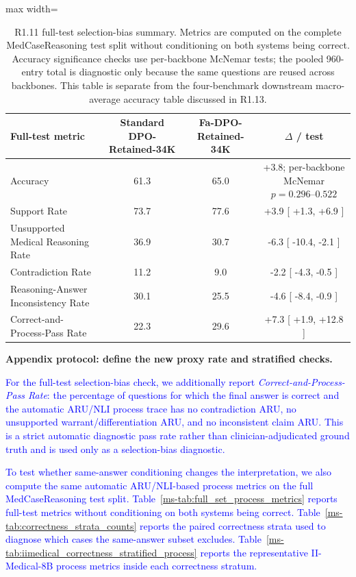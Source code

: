 \documentclass[12pt]{article}
\newcommand{\added}[1]{\textcolor{blue}{#1}}
\begin{document}
\begin{table}[htbp]
\centering
\small
\caption{R1.11 full-test selection-bias summary. Metrics are computed on the complete MedCaseReasoning test split without conditioning on both systems being correct. Accuracy significance checks use per-backbone McNemar tests; the pooled 960-entry total is diagnostic only because the same questions are reused across backbones. This table is separate from the four-benchmark downstream macro-average accuracy table discussed in R1.13.}
\label{tab:response_r111_full_test_summary}
\begin{adjustbox}{max width=\textwidth}
\begingroup\color{blue}
\begin{tabular}{@{}lccc@{}}
\toprule
\textbf{Full-test metric} & \textbf{Standard DPO-Retained-34K} & \textbf{Fa-DPO-Retained-34K} & \textbf{$\Delta$ / test} \\
\midrule
Accuracy & 61.3 & 65.0 & +3.8; per-backbone McNemar $p=0.296$--$0.522$ \\
Support Rate & 73.7 & 77.6 & +3.9 [ +1.3, +6.9 ] \\
Unsupported Medical Reasoning Rate & 36.9 & 30.7 & -6.3 [ -10.4, -2.1 ] \\
Contradiction Rate & 11.2 & 9.0 & -2.2 [ -4.3, -0.5 ] \\
Reasoning-Answer Inconsistency Rate & 30.1 & 25.5 & -4.6 [ -8.4, -0.9 ] \\
Correct-and-Process-Pass Rate & 22.3 & 29.6 & +7.3 [ +1.9, +12.8 ] \\
\bottomrule
\end{tabular}
\endgroup
\end{adjustbox}
\end{table}

\textbf{Appendix protocol: define the new proxy rate and stratified checks.}
\begin{displayquote}
\added{For the full-test selection-bias check, we additionally report \textit{Correct-and-Process-Pass Rate}: the percentage of questions for which the final answer is correct and the automatic ARU/NLI process trace has no contradiction ARU, no unsupported warrant/differentiation ARU, and no inconsistent claim ARU. This is a strict automatic diagnostic pass rate rather than clinician-adjudicated ground truth and is used only as a selection-bias diagnostic.}

\added{To test whether same-answer conditioning changes the interpretation, we also compute the same automatic ARU/NLI-based process metrics on the full MedCaseReasoning test split. Table~\ref*{ms-tab:full_set_process_metrics} reports full-test metrics without conditioning on both systems being correct. Table~\ref*{ms-tab:correctness_strata_counts} reports the paired correctness strata used to diagnose which cases the same-answer subset excludes. Table~\ref*{ms-tab:iimedical_correctness_stratified_process} reports the representative II-Medical-8B process metrics inside each correctness stratum.}
\end{displayquote}
\end{document}
